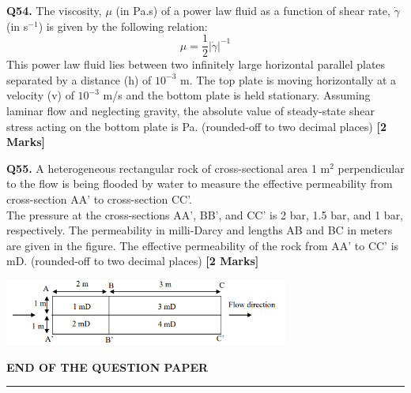 \documentclass[11pt]{article}
\newcommand{\questionb}[2]{
    \noindent\textbf{Q#2.} #1 \hfill \textbf{[2 Marks]}
}
\begin{document}
\questionb{The viscosity, \( \mu \) (in Pa.s) of a power law fluid as a function of shear rate, \( \dot{\gamma} \) (in s\(^{-1}\)) is given by the following relation: \[
\mu = \frac{1}{2} |\dot{\gamma}|^{-1}
\] This power law fluid lies between two infinitely large horizontal parallel plates separated by a distance (h) of \( 10^{-3} \) m. The top plate is moving horizontally at a velocity (v) of \( 10^{-3} \) m/s and the bottom plate is held stationary. Assuming laminar flow and neglecting gravity, the absolute value of steady-state shear stress acting on the bottom plate is \underline{\hspace{3cm}} Pa. (rounded-off to two decimal places)}{54}
\vspace{0.5cm}

\questionb{A heterogeneous rectangular rock of cross-sectional area 1 m\(^2\) perpendicular to the flow is being flooded by water to measure the effective permeability from cross-section AA’ to cross-section CC’. \\
The pressure at the cross-sections AA’, BB’, and CC’ is 2 bar, 1.5 bar, and 1 bar, respectively. The permeability in milli-Darcy and lengths AB and BC in meters are given in the figure. The effective permeability of the rock from AA’ to CC’ is \underline{\hspace{3cm}} mD. (rounded-off to two decimal places)}{55}
\begin{center}
\includegraphics[width=0.7\textwidth]{figures/55.png}
\end{center}
\vspace{0.5cm}

\vspace{5cm}
\begin{center}
\textbf{END OF THE QUESTION PAPER} \\
\rule{\textwidth}{0.5pt}
\end{center}
\end{document}
